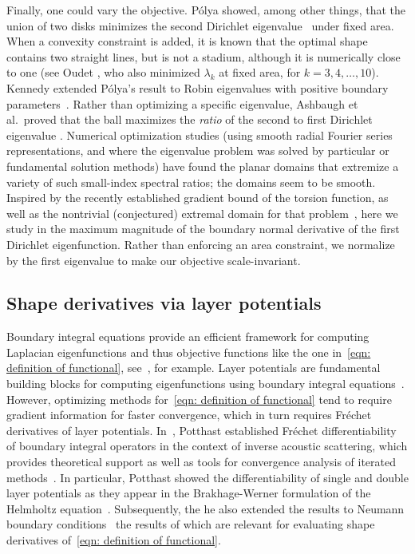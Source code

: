 \documentclass{amsart}
\theoremstyle{plain}
\begin{document}
Finally, one could vary the objective. P{\'o}lya showed, among other things, that the union of two disks minimizes the
second %
Dirichlet eigenvalue~\cite{polya1955characteristic} under fixed area.
When a convexity constraint is added, it is known that the optimal shape
contains two straight lines, but is not a stadium, although it is numerically close
to one (see Oudet \cite{oudet04}, who also minimized $\lambda_k$ at fixed area,
for $k=3,4,\dots,10$).
Kennedy extended P{\'o}lya's result to Robin eigenvalues with positive boundary parameters~\cite{kennedy2009isoperimetric}.
Rather than optimizing a specific eigenvalue, Ashbaugh et al.\ proved that the ball maximizes the {\em ratio} of the second to first Dirichlet eigenvalue \cite{ashbaugh1992sharp}.
Numerical optimization studies (using smooth radial Fourier series representations,
and where the eigenvalue problem was solved
by particular \cite{osting10} or fundamental solution \cite{antunes12}
methods) have found
the planar domains that extremize a variety of such small-index spectral ratios;
the domains seem to be smooth.
Inspired by the recently established gradient bound of the torsion function, as well as the nontrivial (conjectured) extremal domain for that problem~\cite{hoskins2021towards}, here we study in the maximum magnitude of the boundary normal derivative of the first Dirichlet eigenfunction.
Rather than enforcing an area constraint, we normalize by the first eigenvalue to make our objective scale-invariant.



\subsection{Shape derivatives via layer potentials}
Boundary integral equations provide an efficient framework for computing Laplacian eigenfunctions and thus objective functions like the one in~\eqref{eqn: definition of functional}, see~\cite{zhao2015robust}, for example. 
Layer potentials are fundamental building blocks for computing eigenfunctions using boundary integral equations~\cite{colton2013integral}. 
However, optimizing methods for~\eqref{eqn: definition of functional} tend to require gradient information for faster convergence,
which in turn requires Fr\'echet derivatives of
layer potentials.
In~\cite{potthast1994frechet}, Potthast established Fr\'echet differentiability of boundary integral operators in the context of inverse acoustic scattering, which provides theoretical support as well as tools for convergence analysis of iterated methods~\cites{hohage1998newton,hohage1997logarithmic}.
In particular, Potthast showed the differentiability of single and double layer potentials as they appear in the Brakhage-Werner formulation of the Helmholtz equation~\cites{brakhage1965dirichletsche,colton2013integral}.
Subsequently, the he also extended the results to Neumann boundary conditions~\cite{potthast1996frechet} the results of which are relevant for evaluating shape derivatives of~\eqref{eqn: definition of functional}. 
\end{document}
